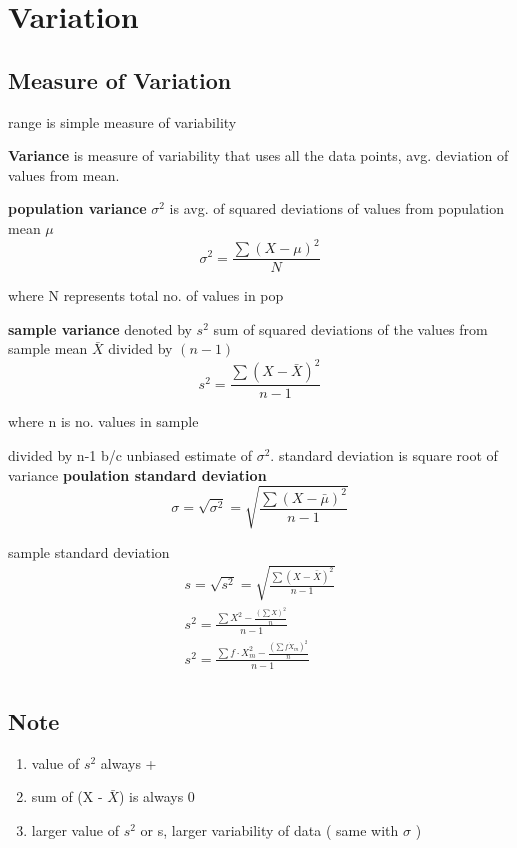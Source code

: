 \documentclass[11pt]{amsart}
\begin{document}
\section{Variation}
\subsection{Measure of Variation}
\par range is simple measure of variability
\par \textbf{Variance} is measure of variability that uses all the data points, avg. deviation of values from mean.
\par \textbf{population variance} $\sigma^2$ is avg. of squared deviations of values from population mean $\mu$
\begin{equation}
\sigma^2 = \frac{\sum{(X-\mu)^2}}{N}
\end{equation}
\par where N represents total no. of values in pop
\par \textbf{sample variance} denoted by $s^2$ sum of squared deviations of the values from sample mean $\bar{X}$ divided by $(n-1)$
\begin{equation}
s^2 = \frac {\sum{(X-\bar{X})^2}}{n-1}
\end{equation}
\par where n is no. values in sample
\par divided by n-1  b/c unbiased estimate of $\sigma^2$. standard deviation is square root of variance
\textbf{poulation standard deviation}
\begin{equation}
\sigma  = \sqrt{\sigma^2} = \sqrt {\frac{\sum{(X-\bar{\mu})^2}}{n-1}}
\end{equation}
\par sample standard deviation
\begin{equation}
\begin{split}
s  = \sqrt{s^2} = \sqrt {\frac{\sum{(X-\bar{X})^2}}{n-1}} \\
s^2 = \frac{\sum{X^2 - \frac{(\sum X)^2}{n}}}{n-1} \\
s^2 = \frac{\sum{f \cdot X_m^2 - \frac{(\sum f \dot X_m)^2}{n}}}{n-1} \\
\end{split}
\end{equation}
\subsection{Note}
\begin{enumerate}
\item value of $s^2$ always +
\item sum of (X - $\bar{X}$) is always 0
\item larger value of $s^2$ or s, larger variability of data ( same with $\sigma$ )
\end{enumerate}
\end{document}
